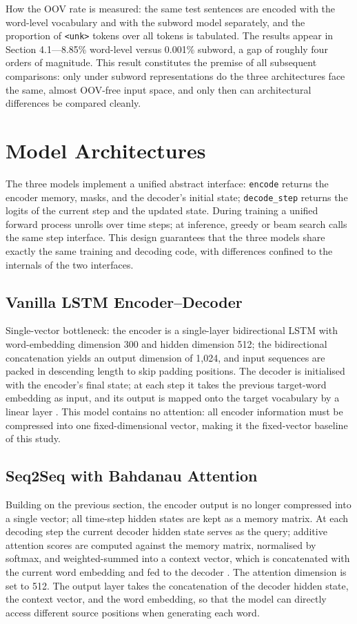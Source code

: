 \documentclass[a4paper,12pt]{vpcoe}
\begin{document}
How the OOV rate is measured: the same test sentences are encoded with the word-level vocabulary and with the subword model separately, and the proportion of \texttt{<unk>} tokens over all tokens is tabulated. The results appear in Section 4.1---8.85\% word-level versus 0.001\% subword, a gap of roughly four orders of magnitude. This result constitutes the premise of all subsequent comparisons: only under subword representations do the three architectures face the same, almost OOV-free input space, and only then can architectural differences be compared cleanly.

\section{Model Architectures}
The three models implement a unified abstract interface: \texttt{encode} returns the encoder memory, masks, and the decoder's initial state; \texttt{decode\_step} returns the logits of the current step and the updated state. During training a unified forward process unrolls over time steps; at inference, greedy or beam search calls the same step interface. This design guarantees that the three models share exactly the same training and decoding code, with differences confined to the internals of the two interfaces.

\subsection{Vanilla LSTM Encoder--Decoder}
Single-vector bottleneck: the encoder is a single-layer bidirectional LSTM with word-embedding dimension 300 and hidden dimension 512; the bidirectional concatenation yields an output dimension of 1,024, and input sequences are packed in descending length to skip padding positions. The decoder is initialised with the encoder's final state; at each step it takes the previous target-word embedding as input, and its output is mapped onto the target vocabulary by a linear layer \cite{sutskever2014,cho2014}. This model contains no attention: all encoder information must be compressed into one fixed-dimensional vector, making it the fixed-vector baseline of this study.

\subsection{Seq2Seq with Bahdanau Attention}
Building on the previous section, the encoder output is no longer compressed into a single vector; all time-step hidden states are kept as a memory matrix. At each decoding step the current decoder hidden state serves as the query; additive attention scores are computed against the memory matrix, normalised by softmax, and weighted-summed into a context vector, which is concatenated with the current word embedding and fed to the decoder \cite{bahdanau2015}. The attention dimension is set to 512. The output layer takes the concatenation of the decoder hidden state, the context vector, and the word embedding, so that the model can directly access different source positions when generating each word.
\end{document}
